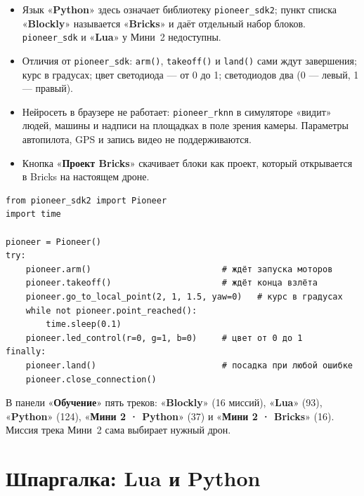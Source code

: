 \documentclass[11pt,a4paper]{article}
\newcommand{\ui}[1]{«\textbf{#1}»}
\begin{document}
\begin{itemize}[itemsep=1pt]
    \item Язык \ui{Python} здесь означает библиотеку \texttt{pioneer\_sdk2}; пункт списка \ui{Blockly} называется
          \ui{Bricks} и даёт отдельный набор блоков. \texttt{pioneer\_sdk} и \ui{Lua} у Мини~2 недоступны.
    \item Отличия от \texttt{pioneer\_sdk}: \texttt{arm()}, \texttt{takeoff()} и \texttt{land()} сами ждут завершения;
          курс в градусах; цвет светодиода — от 0 до 1; светодиодов два (0 — левый, 1 — правый).
    \item Нейросеть в браузере не работает: \texttt{pioneer\_rknn} в симуляторе «видит» людей, машины и надписи
          на площадках в поле зрения камеры. Параметры автопилота, GPS и запись видео не поддерживаются.
    \item Кнопка \ui{Проект Bricks} скачивает блоки как проект, который открывается в Bricks на настоящем дроне.
\end{itemize}

\begin{lstlisting}[style=py]
from pioneer_sdk2 import Pioneer
import time

pioneer = Pioneer()
try:
    pioneer.arm()                          # ждёт запуска моторов
    pioneer.takeoff()                      # ждёт конца взлёта
    pioneer.go_to_local_point(2, 1, 1.5, yaw=0)   # курс в градусах
    while not pioneer.point_reached():
        time.sleep(0.1)
    pioneer.led_control(r=0, g=1, b=0)     # цвет от 0 до 1
finally:
    pioneer.land()                         # посадка при любой ошибке
    pioneer.close_connection()
\end{lstlisting}

\begin{tip}
В панели \ui{Обучение} пять треков: \ui{Blockly} (16 миссий), \ui{Lua} (93), \ui{Python} (124),
\ui{Мини 2 · Python} (37) и \ui{Мини 2 · Bricks} (16). Миссия трека Мини~2 сама выбирает нужный дрон.
\end{tip}

\section{Шпаргалка: Lua и Python}
\end{document}
